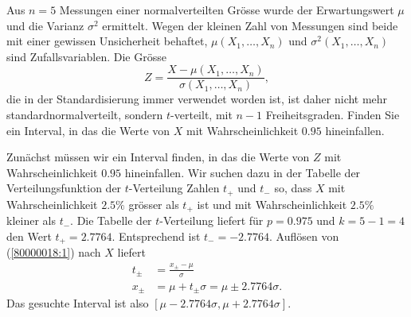 Aus $n=5$ Messungen einer normalverteilten Grösse wurde der Erwartungswert
$\mu$ und die Varianz $\sigma^2$ ermittelt.
Wegen der kleinen Zahl von Messungen sind beide mit einer gewissen
Unsicherheit behaftet, $\mu(X_1,\dots,X_n)$ und  $\sigma^2(X_1,\dots,X_n)$
sind Zufallsvariablen.
Die Grösse
\begin{equation}
Z=\frac{X-\mu(X_1,\dots,X_n)}{\sigma(X_1,\dots,X_n)},
\label{80000018:1}
\end{equation}
die in der Standardisierung immer verwendet worden ist, ist daher
nicht mehr standardnormalverteilt, sondern $t$-verteilt, mit $n-1$ 
Freiheitsgraden. Finden Sie ein Interval, in das die Werte von $X$
mit Wahrscheinlichkeit $0.95$ hineinfallen.

\begin{loesung}
Zunächst müssen wir ein Interval finden, in das die Werte von
$Z$ mit Wahrscheinlichkeit $0.95$ hineinfallen. Wir suchen dazu in
der Tabelle der Verteilungsfunktion der $t$-Verteilung Zahlen $t_+$
und $t_-$ so, dass $X$ mit Wahrscheinlichkeit $2.5\%$ grösser als $t_+$
ist und mit Wahrscheinlichkeit $2.5\%$ kleiner als $t_-$. Die Tabelle
der $t$-Verteilung liefert für $p=0.975$ und $k=5-1=4$ den Wert
$t_+=2.7764$. Entsprechend ist $t_-=-2.7764$. Auflösen von
(\ref{80000018:1}) nach $X$ liefert
\begin{align*}
t_\pm &=\frac{x_{\pm}-\mu}{\sigma}\\
x_\pm&=\mu +t_\pm\sigma = \mu \pm 2.7764\sigma.
\end{align*}
Das gesuchte Interval ist also $[\mu-2.7764\sigma,\mu+2.7764\sigma]$.
\end{loesung}
